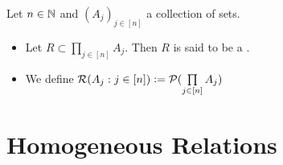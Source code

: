 \begin{defn}
	Let $n \in \mathbb{N}$ and $(A_j)_{j \in [n]}$ a collection of sets.
	\begin{itemize}
		\item Let $R \subset \prod\limits_{j \in [n]} A_j$. Then $R$ is said to be a . 
		\item We define $\mathcal{R}(A_j:j \in [n]) \vcentcolon= \mathcal{P}(\prod\limits_{j \in [n]} A_j)$
	\end{itemize}
\end{defn}



























































\newpage
\section{Homogeneous Relations}


